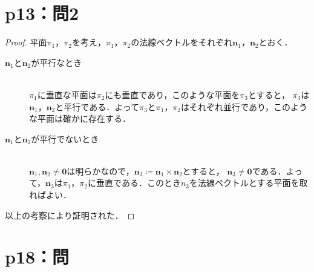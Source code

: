 \documentclass[a4paper,10pt,fleqn]{ltjsarticle}
\begin{document}
\section*{p13：問2}

\begin{tleftbar}
  \begin{proof}
    平面$\pi_1$，$\pi_2$を考え，$\pi_1$，$\pi_2$の法線ベクトルをそれぞれ$\bm{n}_1$，$\bm{n}_2$とおく．
    \begin{description}
      \item[$\bm{n}_1$と$\bm{n}_2$が平行なとき] \mbox{}\\
            $\pi_1$に垂直な平面は$\pi_2$にも垂直であり，このような平面を$\pi_3$とすると，
            $\pi_3$は$\bm{n}_1$，$\bm{n}_2$と平行である．よって$\pi_3$と$\pi_1$，$\pi_2$はそれぞれ並行であり，このような平面は確かに存在する．
      \item[$\bm{n}_1$と$\bm{n}_2$が平行でないとき] \mbox{} \\
            $\bm{n}_1 , \bm{n}_2 \ne \bm{0}$は明らかなので，$\bm{n}_3 \coloneqq \bm{n}_1 \times \bm{n}_2$とすると，
            $\bm{n}_3 \ne \bm{0}$である．よって，$\bm{n}_3$は$\pi_1$，$\pi_2$に垂直である．このとき$n_3$を法線ベクトルとする平面を取ればよい．
    \end{description}
    以上の考察により証明された．
  \end{proof}
\end{tleftbar}
\newpage
%
%
%
\section*{p18：問}
\end{document}
